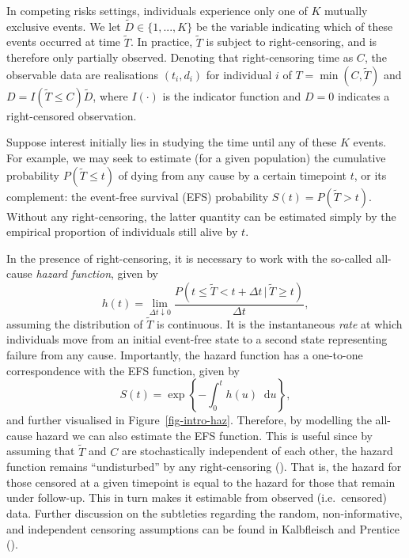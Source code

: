 \documentclass[
  letterpaper,
  DIV=11,
  numbers=noendperiod]{scrreprt}
\newcommand{\given}{\,|\,}
\newcommand\diff{\mathop{}\!\mathrm{d}}
\begin{document}
In competing risks settings, individuals experience only one of \(K\)
mutually exclusive events. We let \(\tilde{D} \in \{1,...,K\}\) be the
variable indicating which of these events occurred at time
\(\tilde{T}\). In practice, \(\tilde{T}\) is subject to right-censoring,
and is therefore only partially observed. Denoting that right-censoring
time as \(C\), the observable data are realisations \((t_i, d_i)\) for
individual \(i\) of \(T = \min(C,\tilde{T})\) and
\(D = I(\tilde{T} \leq C)\tilde{D}\), where \(I(\cdot)\) is the
indicator function and \(D = 0\) indicates a right-censored observation.

Suppose interest initially lies in studying the time until any of these
\(K\) events. For example, we may seek to estimate (for a given
population) the cumulative probability \(P(\tilde{T} \leq t)\) of dying
from any cause by a certain timepoint \(t\), or its complement: the
event-free survival (EFS) probability \(S(t) = P(\tilde{T} > t)\).
Without any right-censoring, the latter quantity can be estimated simply
by the empirical proportion of individuals still alive by \(t\).

In the presence of right-censoring, it is necessary to work with the
so-called all-cause \emph{hazard function}, given by \[
    h(t) = \lim_{\Delta t \downarrow 0} \frac{P(t \leq \tilde{T} < t + \Delta t\given \tilde{T} \geq t)}{\Delta t},
\] assuming the distribution of \(\tilde{T}\) is continuous. It is the
instantaneous \emph{rate} at which individuals move from an initial
event-free state to a second state representing failure from any cause.
Importantly, the hazard function has a one-to-one correspondence with
the EFS function, given by \[
  S(t) = \exp \left\{ - \int_{0}^{t} h(u)\diff u \right\},
\] and further visualised in Figure~\ref{fig-intro-haz}. Therefore, by
modelling the all-cause hazard we can also estimate the EFS function.
This is useful since by assuming that \(\tilde{T}\) and \(C\) are
stochastically independent of each other, the hazard function remains
``undisturbed'' by any right-censoring
(). That is, the hazard for those censored at a given
timepoint is equal to the hazard for those that remain under follow-up.
This in turn makes it estimable from observed (i.e.~censored) data.
Further discussion on the subtleties regarding the random,
non-informative, and independent censoring assumptions can be found in
Kalbfleisch and Prentice
().
\end{document}
